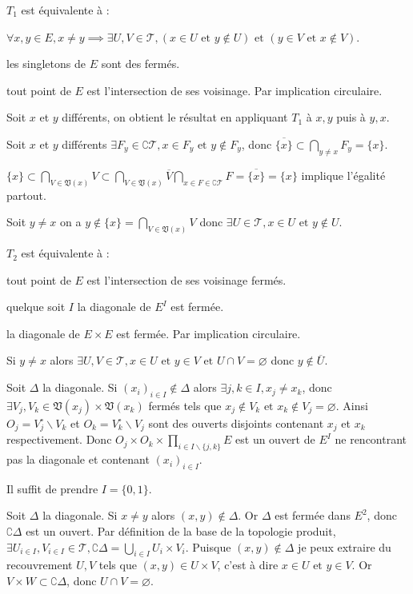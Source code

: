 \documentclass[a4paper, 11pt, french]{book}
\newenvironment{itemise}{\itemize}{\enditemize}
\theoremstyle{plain} %
\theoremstyle{definition} %
\theoremstyle{remark} %
\renewcommand{\setminus}{\backslash}
\newcommand{\1}{\mathds{1}}
\newcommand\vide{\varnothing}
\newcommand\et{\text{ et }}
\begin{document}
\proposition
$T_1$ est équivalente à :
\begin{itemise}
	\item $\forall x, y\in E, x\neq y\implies\exists U, V\in\mathscr{T}, (x\in U\et y\notin U)\et(y\in V\et x\notin V)$.
	\item les singletons de $E$ sont des fermés.
	\item tout point de $E$ est l'intersection de ses voisinage.
\end{itemise}
\demonstration
Par implication circulaire.
\begin{itemise}
	\item Soit $x$ et $y$ différents, on obtient le résultat en appliquant $T_1$ à $x, y$ puis à $y, x$.
	\item Soit $x$ et $y$ différents $\exists F_y\in\complement\mathscr{T}, x\in F_y\et y\notin F_y$, donc $\overline{\{x\}}\subset\bigcap_{y\neq x}F_y=\{x\}$.
	\item $\{x\}\subset\bigcap_{V\in\mathfrak{V}(x)}V\subset\bigcap_{V\in\mathfrak{V}(x)}\overline{V}\bigcap_{x\in F\in\complement\mathscr{T}}F=\overline{\{x\}}=\{x\}$ implique l'égalité partout.
	\item Soit $y\neq x$ on a $y\notin\{x\}=\bigcap_{V\in\mathfrak{V}(x)}V$ donc $\exists U\in\mathscr{T}, x\in U\et y\notin U$.
\end{itemise}

\proposition
$T_2$ est équivalente à :
\begin{itemise}
	\item tout point de $E$ est l'intersection de ses voisinage fermés.
	\item quelque soit $I$ la diagonale de $E^I$ est fermée.
	\item la diagonale de $E\times E$ est fermée.
\end{itemise}
\demonstration Par implication circulaire.
\begin{itemise}
	\item Si $y\neq x$ alors $\exists U, V\in\mathscr{T}, x\in U\et y\in V\et U\cap V=\vide$ donc $y\notin\overline{U}$.
	\item Soit $\Delta$ la diagonale.
	Si $(x_i)_{i\in I}\notin\Delta$ alors $\exists j, k\in I, x_j\neq x_k$, donc $\exists V_j, V_k\in\mathfrak{V}(x_j)\times\mathfrak{V}(x_k)$ fermés tels que $x_j\notin V_k\et x_k\notin V_j=\vide$.
	Ainsi $O_j=V_j^\circ\setminus V_k$ et $O_k=V_k^\circ\setminus V_j$ sont des ouverts disjoints contenant $x_j$ et $x_k$ respectivement.
	Donc $O_j\times O_k\times\prod_{i\in I\setminus\{j, k\}}E$ est un ouvert de $E^I$ ne rencontrant pas la diagonale et contenant $(x_i)_{i\in I}$.
	\item Il suffit de prendre $I=\{0, 1\}$.
	\item Soit $\Delta$ la diagonale.
	Si $x\neq y$ alors $(x, y)\notin\Delta$.
	Or $\Delta$ est fermée dans $E^2$, donc $\complement\Delta$ est un ouvert.
	Par définition de la base de la topologie produit, $\exists U_{i\in I}, V_{i\in I}\in\mathscr{T}, \complement\Delta=\bigcup_{i\in I} U_i\times V_i$.
	Puisque $(x, y)\notin\Delta$ je peux extraire du recouvrement $U, V$ tels que $(x, y)\in U\times V$, c'est à dire $x\in U\et y\in V$.
	Or $V\times W\subset\complement\Delta$, donc $U\cap V=\vide$.
\end{itemise}
\end{document}
